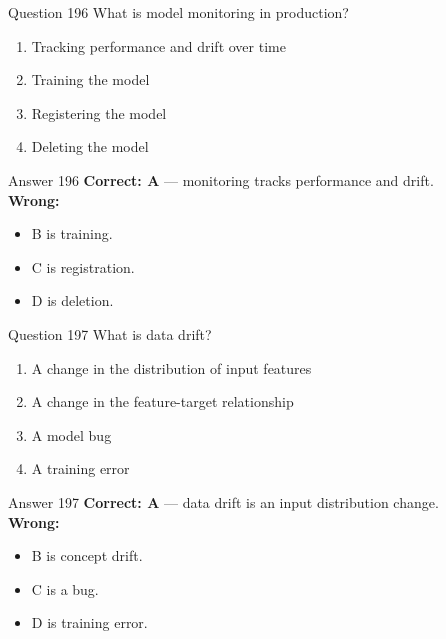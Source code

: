 \documentclass[aspectratio=169,11pt]{beamer}
\begin{document}
	\begin{frame}{Question 196}
		What is model monitoring in production?
		\begin{enumerate}[label=\Alph*.]
			\item Tracking performance and drift over time
			\item Training the model
			\item Registering the model
			\item Deleting the model
		\end{enumerate}
	\end{frame}
	\begin{frame}{Answer 196}
		\textbf{Correct: A} --- monitoring tracks performance and drift.\\
		\vspace{0.5em}
		\textbf{Wrong:}
		\begin{itemize}
			\item B is training.
			\item C is registration.
			\item D is deletion.
		\end{itemize}
	\end{frame}
	
	\begin{frame}{Question 197}
		What is data drift?
		\begin{enumerate}[label=\Alph*.]
			\item A change in the distribution of input features
			\item A change in the feature-target relationship
			\item A model bug
			\item A training error
		\end{enumerate}
	\end{frame}
	\begin{frame}{Answer 197}
		\textbf{Correct: A} --- data drift is an input distribution change.\\
		\vspace{0.5em}
		\textbf{Wrong:}
		\begin{itemize}
			\item B is concept drift.
			\item C is a bug.
			\item D is training error.
		\end{itemize}
	\end{frame}
	
\end{document}
